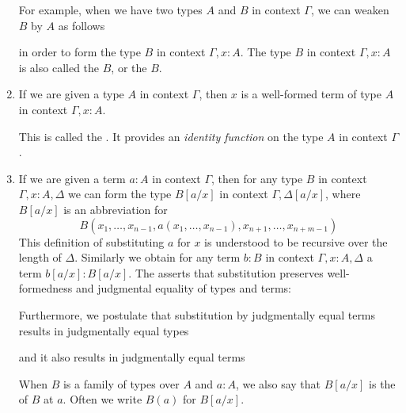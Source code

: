 \begin{enumerate}
For example, when we have two types $A$ and $B$ in context $\Gamma$, we can weaken $B$ by $A$ as follows
\begin{prooftree}
\end{prooftree}
in order to form the type $B$ in context $\Gamma,x:A$. The type $B$ in context $\Gamma,x:A$ is also called the  $B$, or the  $B$.
\item If we are given a type $A$ in context $\Gamma$, then $x$ is a well-formed term of type $A$ in context $\Gamma,x:A$.
\begin{prooftree}
\end{prooftree}
This is called the . It provides an \emph{identity function} on the type $A$ in context $\Gamma$.
\item If we are given a term $a:A$ in context $\Gamma$, then for any type $B$ in context $\Gamma,x:A,\Delta$ we can form the type $B[a/x]$ in context $\Gamma,\Delta[a/x]$, where $B[a/x]$ is an abbreviation for
\begin{equation*}
B(x_1,\ldots,x_{n-1},a(x_1,\ldots,x_{n-1}),x_{n+1},\ldots,x_{n+m-1})
\end{equation*}
This definition of substituting $a$ for $x$ is understood to be recursive over the length of $\Delta$. Similarly we obtain for any term $b:B$ in context $\Gamma,x:A,\Delta$ a term $b[a/x]:B[a/x]$. The  asserts that substitution preserves well-formedness and judgmental equality of types and terms:
\begin{prooftree}
\end{prooftree}
Furthermore, we postulate that substitution by judgmentally equal terms results in judgmentally equal types
\begin{prooftree}
\end{prooftree}
and it also results in judgmentally equal terms
\begin{prooftree}
\end{prooftree}
When $B$ is a family of types over $A$ and $a:A$, we also say that $B[a/x]$ is the  of $B$ at $a$. Often we write $B(a)$ for $B[a/x]$.
\end{enumerate}




